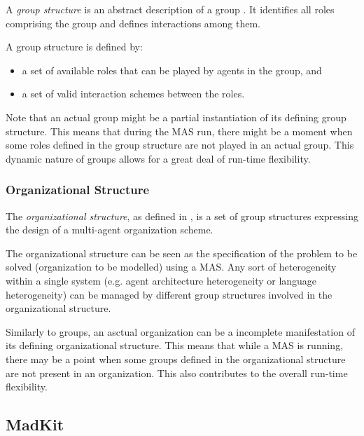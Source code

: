 A \textit{group structure} is an abstract description of a group \cite{Ferber97}.
It identifies all roles comprising the group and defines interactions among them.

A group structure is defined by:
\begin{itemize}
	\item a set of available roles that can be played by agents in the group, and
	\item a set of valid interaction schemes between the roles.
\end{itemize}

Note that an actual group might be a partial instantiation of its defining group structure.
This means that during the MAS run, there might be a moment when some roles defined in the group structure are not played in an actual group.
This dynamic nature of groups allows for a great deal of run-time flexibility.

\subsubsection*{Organizational Structure}

The \textit{organizational structure}, as defined in \cite{Ferber97}, is a set of group structures expressing the design of a multi-agent organization scheme.

The organizational structure can be seen as the specification of the problem to be solved (organization to be modelled) using a MAS.
Any sort of heterogeneity within a single system (e.g. agent architecture heterogeneity or language heterogeneity) can be managed by different group structures involved in the organizational structure.

Similarly to groups, an asctual organization can be a incomplete manifestation of its defining organizational structure.
This means that while a MAS is running, there may be a point when some groups defined in the organizational structure are not present in an organization.
This also contributes to the overall run-time flexibility.

\subsection{MadKit}

